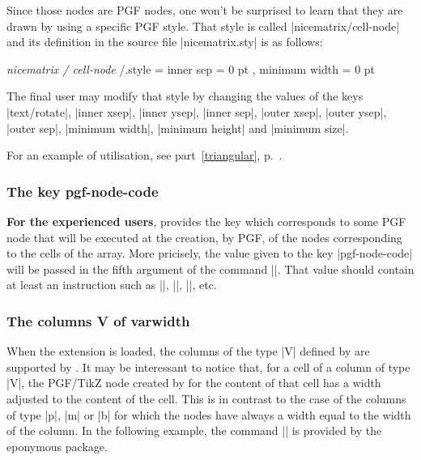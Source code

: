 \documentclass[dvipsnames]{article}%
\begin{document}
\bigskip
Since those nodes are PGF nodes, one won't be surprised to learn that they are
drawn by using a specific PGF style. That style is called |nicematrix/cell-node|
and its definition in the source file |nicematrix.sty| is as follows:

\begin{Code}
\pgfset 
  { 
    \emph{nicematrix / cell-node} /.style = 
     {
       inner sep = 0 pt ,
       minimum width = 0 pt
     }
  }
\end{Code}

The final user may modify that style by changing the values of the keys |text/rotate|,
|inner xsep|, |inner ysep|, |inner sep|, |outer xsep|, |outer ysep|, |outer sep|,
|minimum width|, |minimum height| and |minimum size|.

\medskip
For an example of utilisation, see part~\ref{triangular}, p.~\pageref{triangular}.


\subsubsection{The key pgf-node-code}


\textbf{For the experienced users},  provides the key
 which corresponds to some PGF node that will be
executed at the creation, by PGF, of the nodes corresponding to the cells of the
array. More pricisely, the value given to the key |pgf-node-code| will be passed
in the fifth argument of the command |\pgfnode|. That value should contain at
least an instruction such as |\pgfusepath|, |\pgfusepathqstroke|, |\pgfusepathqfill|,
etc.

\subsubsection{The columns V of varwidth}

\label{node-V}

When the extension  is loaded, the columns of the type |V|
defined by  are supported by . It may be
interessant to notice that, for a cell of a column of type |V|, the PGF/TikZ
node created by  for the content of that cell has a width
adjusted to the content of the cell. This is in contrast to the case of the
columns of type |p|, |m| or |b| for which the nodes have always a width equal
to the width of the column. In the following example, the command |\lipsum| is
provided by the eponymous package.
\end{document}
